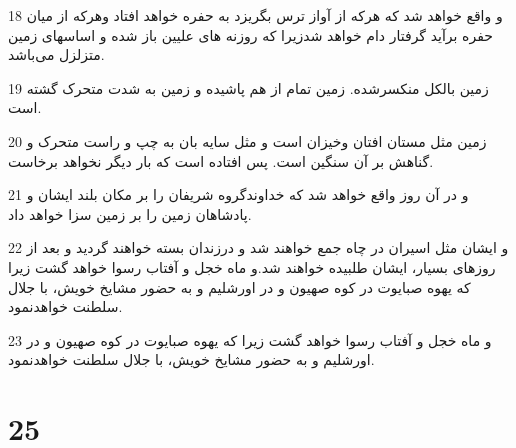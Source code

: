 \par 18 و واقع خواهد شد که هرکه از آواز ترس بگریزد به حفره خواهد افتاد وهر‌که از میان حفره برآید گرفتار دام خواهد شدزیرا که روزنه های علیین باز شده و اساسهای زمین متزلزل می‌باشد.
\par 19 زمین بالکل منکسرشده. زمین تمام از هم پاشیده و زمین به شدت متحرک گشته است.
\par 20 زمین مثل مستان افتان وخیزان است و مثل سایه بان به چپ و راست متحرک و گناهش بر آن سنگین است. پس افتاده است که بار دیگر نخواهد برخاست.
\par 21 و در آن روز واقع خواهد شد که خداوندگروه شریفان را بر مکان بلند ایشان و پادشاهان زمین را بر زمین سزا خواهد داد.
\par 22 و ایشان مثل اسیران در چاه جمع خواهند شد و درزندان بسته خواهند گردید و بعد از روزهای بسیار، ایشان طلبیده خواهند شد.و ماه خجل و آفتاب رسوا خواهد گشت زیرا که یهوه صبایوت در کوه صهیون و در اورشلیم و به حضور مشایخ خویش، با جلال سلطنت خواهدنمود.
\par 23 و ماه خجل و آفتاب رسوا خواهد گشت زیرا که یهوه صبایوت در کوه صهیون و در اورشلیم و به حضور مشایخ خویش، با جلال سلطنت خواهدنمود.
 
\chapter{25}

